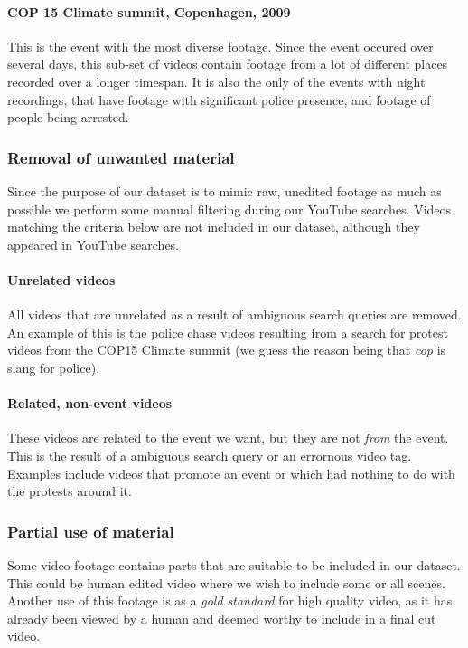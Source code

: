 \paragraph{COP 15 Climate summit, Copenhagen, 2009}
%
This is the event with the most diverse footage. Since the event occured over several days, this sub-set of videos contain footage from a lot of different places recorded over a longer timespan. It is also the only of the events with night recordings, that have footage with significant police presence, and footage of people being arrested.
%
\subsubsection{Removal of unwanted material}
%
Since the purpose of our dataset is to mimic raw, unedited footage as much as possible we perform some manual filtering during our YouTube searches. Videos matching the criteria below are not included in our dataset, although they appeared in YouTube searches.
%
\paragraph{Unrelated videos}
%
All videos that are unrelated as a result of ambiguous search queries are removed. An example of this is the police chase videos resulting from a search for protest videos from the COP15 Climate summit (we guess the reason being that \emph{cop} is slang for police).
%
\paragraph{Related, non-event videos}
%
These videos are related to the event we want, but they are not \emph{from} the event. This is the result of a ambiguous search query or an errornous video tag. Examples include videos that promote an event or which had nothing to do with the protests around it.
%
\subsubsection{Partial use of material}
%
Some video footage contains parts that are suitable to be included in our dataset. This could be human edited video where we wish to include some or all scenes. Another use of this footage is as a \textit{gold standard} for high quality video, as it has already been viewed by a human and deemed worthy to include in a final cut video.
%
